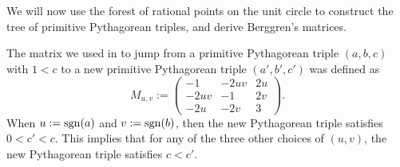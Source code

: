 \begin{example}
  We will now use the forest of rational points on the unit circle to construct the tree of primitive Pythagorean triples, and derive Berggren's matrices.

  The matrix we used in  to jump from a primitive Pythagorean triple $(a,b,c)$ with $1<c$ to a new primitive Pythagorean triple $(a',b',c')$ was defined as
\begin{equation*}
  M_{u,v}
  :=
  \begin{pmatrix}
    -1 & -2uv & 2u \\
    -2uv & -1 & 2v \\
    -2u & -2v & 3
  \end{pmatrix}
  .
\end{equation*}
When $u:=\operatorname{sgn}(a)$ and $v:=\operatorname{sgn}(b)$, then the new Pythagorean triple satisfies $0<c'<c$. This implies that for any of the three other choices of $(u,v)$, the new Pythagorean triple satisfies $c<c'$.


\end{example}
